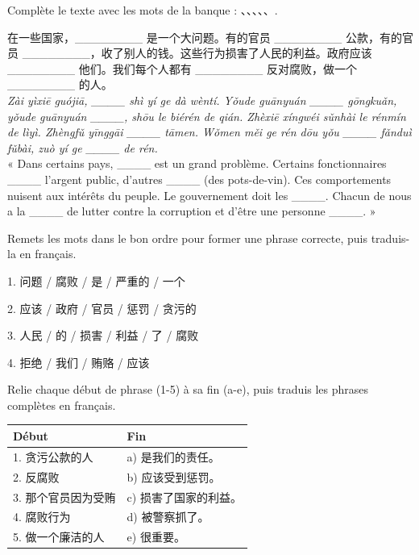 \documentclass[11pt]{article}
\newcommand{\zh}[1]{\ifmmode\text{#1}\else{#1}\fi}
\begin{document}
\begin{exercice}
Complète le texte avec les mots de la banque : \zh{腐败}、\zh{贪污}、\zh{受贿}、\zh{廉洁}、\zh{惩罚}、\zh{责任}.

\begin{textebox}
在一些国家，\_\_\_\_\_\_\_\_ 是一个大问题。有的官员 \_\_\_\_\_\_\_\_ 公款，有的官员 \_\_\_\_\_\_\_\_，收了别人的钱。这些行为损害了人民的利益。政府应该 \_\_\_\_\_\_\_\_ 他们。我们每个人都有 \_\_\_\_\_\_\_\_ 反对腐败，做一个 \_\_\_\_\_\_\_\_ 的人。\\
\emph{Zài yìxiē guójiā, \_\_\_\_ shì yí ge dà wèntí. Yǒude guānyuán \_\_\_\_ gōngkuǎn, yǒude guānyuán \_\_\_\_, shōu le biérén de qián. Zhèxiē xíngwéi sǔnhài le rénmín de lìyì. Zhèngfǔ yīnggāi \_\_\_\_ tāmen. Wǒmen měi ge rén dōu yǒu \_\_\_\_ fǎnduì fǔbài, zuò yí ge \_\_\_\_ de rén.}\\
« Dans certains pays, \_\_\_\_ est un grand problème. Certains fonctionnaires \_\_\_\_ l'argent public, d'autres \_\_\_\_ (des pots-de-vin). Ces comportements nuisent aux intérêts du peuple. Le gouvernement doit les \_\_\_\_. Chacun de nous a la \_\_\_\_ de lutter contre la corruption et d'être une personne \_\_\_\_. »
\end{textebox}
\end{exercice}

\begin{exercice}
Remets les mots dans le bon ordre pour former une phrase correcte, puis traduis-la en français.

1. 问题 / 腐败 / 是 / 严重的 / 一个

2. 应该 / 政府 / 官员 / 惩罚 / 贪污的

3. 人民 / 的 / 损害 / 利益 / 了 / 腐败

4. 拒绝 / 我们 / 贿赂 / 应该
\end{exercice}

\begin{exercice}
Relie chaque début de phrase (1-5) à sa fin (a-e), puis traduis les phrases complètes en français.

\begin{center}
\begin{tabularx}{\linewidth}{|X|X|}
\hline
\rowcolor{popblueL} Début & Fin \\
\hline
1. 贪污公款的人 & a) 是我们的责任。 \\
\hline
2. 反腐败 & b) 应该受到惩罚。 \\
\hline
3. 那个官员因为受贿 & c) 损害了国家的利益。 \\
\hline
4. 腐败行为 & d) 被警察抓了。 \\
\hline
5. 做一个廉洁的人 & e) 很重要。 \\
\hline
\end{tabularx}
\end{center}
\end{exercice}
\end{document}
